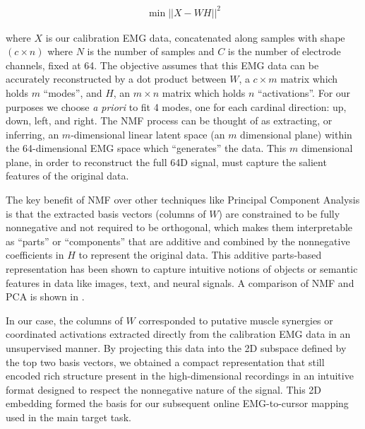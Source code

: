 \documentclass[../main.tex]{subfiles}
\begin{document}
\begin{align}
  \min{||X - WH||^{2}}
\end{align}

where $X$ is our calibration EMG data, concatenated along samples with shape $(c\times{n})$ where $N$ is the number of samples and $C$ is the number of electrode channels, fixed at 64. The objective assumes that this EMG data can be accurately reconstructed by a dot product between $W$, a $c\times{m}$ matrix which holds $m$ ``modes'', and $H$, an $m\times{n}$ matrix which holds $n$ ``activations''. For our purposes we choose \textit{a priori} to fit 4 modes, one for each cardinal direction: up, down, left, and right. The NMF process can be thought of as extracting, or inferring, an $m$-dimensional linear latent space (an $m$ dimensional plane) within the 64-dimensional EMG space which ``generates'' the data. This $m$ dimensional plane, in order to reconstruct the full 64D signal, must capture the salient features of the original data.

The key benefit of NMF over other techniques like Principal Component Analysis is that the extracted basis vectors (columns of $W$) are constrained to be fully nonnegative and not required to be orthogonal, which makes them interpretable as ``parts'' or ``components'' that are additive and combined by the nonnegative coefficients in $H$ to represent the original data. This additive parts-based representation has been shown to capture intuitive notions of objects or semantic features in data like images, text, and neural signals\cite{leeLearningPartsObjects1999a,eggertSparseCodingNMF2004}. A comparison of NMF and PCA is shown in .

In our case, the columns of $W$ corresponded to putative muscle synergies or coordinated activations extracted directly from the calibration EMG data in an unsupervised manner. By projecting this data into the 2D subspace defined by the top two basis vectors, we obtained a compact representation that still encoded rich structure present in the high-dimensional recordings in an intuitive format designed to respect the nonnegative nature of the signal. This 2D embedding formed the basis for our subsequent online EMG-to-cursor mapping used in the main target task.
\end{document}
